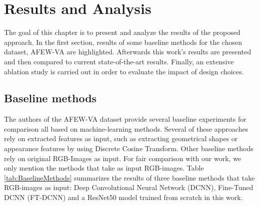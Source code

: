 \chapter{Results and Analysis}\label{chap:Analysis}
The goal of this chapter is to present and analyze the results of the proposed approach. In the first section, results of some baseline methods for the chosen dataset, AFEW-VA are highlighted. Afterwards this work's results are presented and then compared to current state-of-the-art results. Finally, an extensive ablation study is carried out in order to evaluate the impact of design choices.

\section{Baseline methods}
The authors of the AFEW-VA dataset \citep{Kossaifi:2017:AFEW-VADatabase} provide several baseline experiments for comparison all based on machine-learning methods. Several of these approaches rely on extracted features as input, such as extracting geometrical shapes or appearance features by using Discrete Cosine Transform. Other baseline methods rely on original RGB-Images as input. For fair comparison with our work, we only mention the methods that take as input RGB-images. 
\newline\newline
Table \ref{tab:BaselineMethods} summarizes the results of three baseline methods that take RGB-images as input: Deep Convolutional Neural Network (DCNN), Fine-Tuned DCNN (FT-DCNN) and a ResNet50 model trained from scratch in this work.

